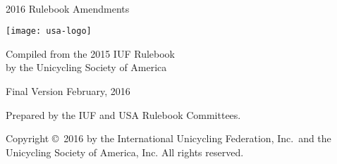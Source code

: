 \begin{titlepage}
\centering
\ \\

{\Huge 2016 Rulebook Amendments}
\vspace{5mm}

\texttt{[image: usa-logo]}

\vspace{5mm}
{\Large Compiled from the 2015 IUF Rulebook\\ }
\vspace{3mm}
{\Large by the Unicycling Society of America}

\vspace{8mm}
{\Large Final Version \quad February, 2016}

\vspace{40mm}
Prepared by the IUF and USA Rulebook Committees.

\vspace{5mm}
{\small Copyright \copyright\ 2016 by the International Unicycling Federation, Inc.\ and the Unicycling Society of America, Inc. All rights reserved.}

\end{titlepage}
